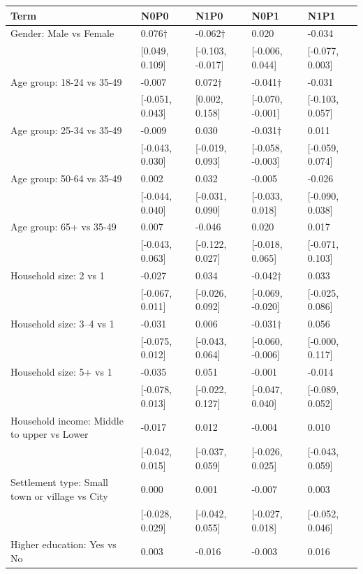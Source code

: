 
\begin{tabular}[t]{lllll}
\toprule
Term & N0P0 & N1P0 & N0P1 & N1P1\\
\midrule
Gender: Male vs Female & 0.076$\dagger$ & -0.062$\dagger$ & 0.020 & -0.034\\
 & {}[0.049, 0.109] & {}[-0.103, -0.017] & {}[-0.006, 0.044] & {}[-0.077, 0.003]\\
Age group: 18-24 vs 35-49 & -0.007 & 0.072$\dagger$ & -0.041$\dagger$ & -0.031\\
 & {}[-0.051, 0.043] & {}[0.002, 0.158] & {}[-0.070, -0.001] & {}[-0.103, 0.057]\\
Age group: 25-34 vs 35-49 & -0.009 & 0.030 & -0.031$\dagger$ & 0.011\\
 & {}[-0.043, 0.030] & {}[-0.019, 0.093] & {}[-0.058, -0.003] & {}[-0.059, 0.074]\\
Age group: 50-64 vs 35-49 & 0.002 & 0.032 & -0.005 & -0.026\\
 & {}[-0.044, 0.040] & {}[-0.031, 0.090] & {}[-0.033, 0.018] & {}[-0.090, 0.038]\\
Age group: 65+ vs 35-49 & 0.007 & -0.046 & 0.020 & 0.017\\
 & {}[-0.043, 0.063] & {}[-0.122, 0.027] & {}[-0.018, 0.065] & {}[-0.071, 0.103]\\
Household size: 2 vs 1 & -0.027 & 0.034 & -0.042$\dagger$ & 0.033\\
 & {}[-0.067, 0.011] & {}[-0.026, 0.092] & {}[-0.069, -0.020] & {}[-0.025, 0.086]\\
Household size: 3–4 vs 1 & -0.031 & 0.006 & -0.031$\dagger$ & 0.056\\
 & {}[-0.075, 0.012] & {}[-0.043, 0.064] & {}[-0.060, -0.006] & {}[-0.000, 0.117]\\
Household size: 5+ vs 1 & -0.035 & 0.051 & -0.001 & -0.014\\
 & {}[-0.078, 0.013] & {}[-0.022, 0.127] & {}[-0.047, 0.040] & {}[-0.089, 0.052]\\
Household income: Middle to upper vs Lower & -0.017 & 0.012 & -0.004 & 0.010\\
 & {}[-0.042, 0.015] & {}[-0.037, 0.059] & {}[-0.026, 0.025] & {}[-0.043, 0.059]\\
Settlement type: Small town or village vs City & 0.000 & 0.001 & -0.007 & 0.003\\
 & {}[-0.028, 0.029] & {}[-0.042, 0.055] & {}[-0.027, 0.018] & {}[-0.052, 0.046]\\
Higher education: Yes vs No & 0.003 & -0.016 & -0.003 & 0.016\\

\end{tabular}
